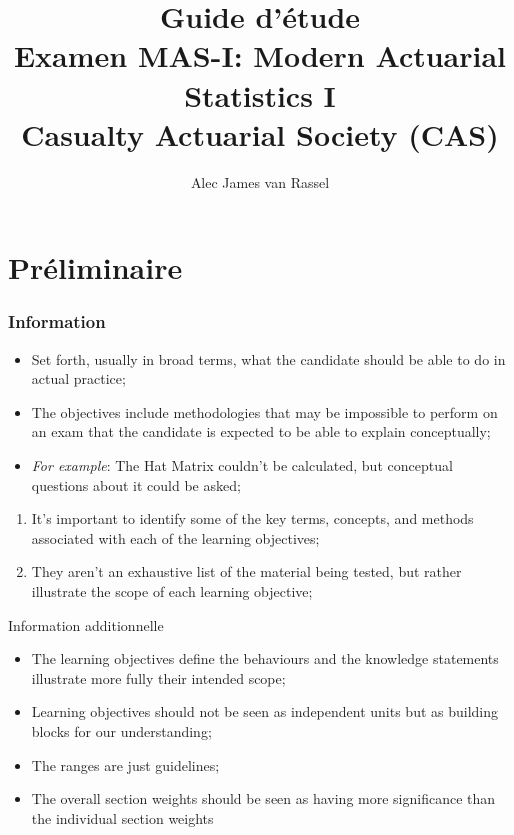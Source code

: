 \documentclass[12pt, titlepage, french]{report}
\title{
	Guide d'étude	\\
	\large Examen MAS-I: Modern Actuarial Statistics I\\
	Casualty Actuarial Society (CAS)}
\date{}
\author{Alec James van Rassel}
\begin{document}
\maketitle

\tableofcontents

\clearpage

\part*{Préliminaire}

\section{Information}

\begin{distributions}[Objectives]
\begin{itemize}
	\item	Set forth, usually in broad terms, what the candidate should be able to do in actual practice;
	\item	The objectives include methodologies that may be impossible to perform on an exam that the candidate is expected to be able to explain conceptually;
	\item	\textit{For example}: The Hat Matrix couldn't be calculated, but conceptual questions about it could be asked;
\end{itemize}
\end{distributions}

\begin{outcomes}
\begin{enumerate}
	\item	It's important to identify some of the key terms, concepts, and methods associated with each of the learning objectives;
	\item	They aren't an exhaustive list of the material being tested, but rather illustrate the scope of each learning objective;
\end{enumerate}
\end{outcomes}

\begin{CHPT_SUMM}{Information additionnelle}
	\begin{itemize}
		\item	The learning objectives define the behaviours and the knowledge statements illustrate more fully their intended scope;
		\item	Learning objectives should not be seen as independent units but as building blocks for our understanding;
		\item	The ranges are just guidelines;
		\item	The overall section weights should be seen as having more significance than the individual section weights
	\end{itemize}
\end{CHPT_SUMM}
\end{document}
